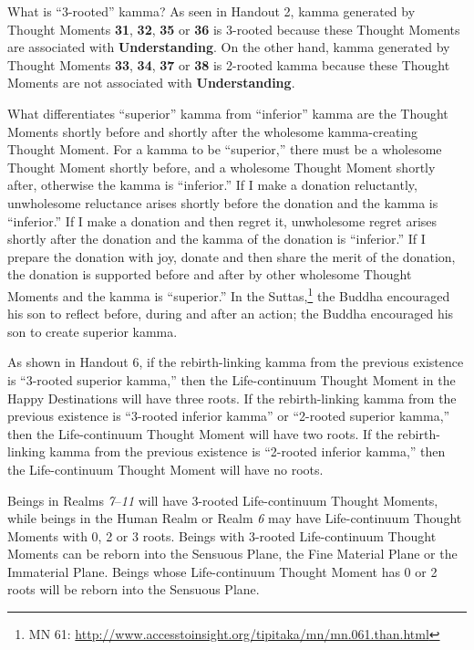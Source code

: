 What is “3-rooted” kamma? As seen in Handout 2, kamma generated by Thought Moments \textbf{31}, \textbf{32}, \textbf{35} or \textbf{36} is 3-rooted because these Thought Moments are associated with \textbf{Understanding}. On the other hand, kamma generated by Thought Moments \textbf{33}, \textbf{34}, \textbf{37} or \textbf{38} is 2-rooted kamma because these Thought Moments are not associated with \textbf{Understanding}.

What differentiates “superior” kamma from “inferior” kamma are the Thought Moments shortly before and shortly after the wholesome kamma-creating Thought Moment. For a kamma to be “superior,” there must be a wholesome Thought Moment shortly before, and a wholesome Thought Moment shortly after, otherwise the kamma is “inferior.” If I make a donation reluctantly, unwholesome reluctance arises shortly before the donation and the kamma is “inferior.” If I make a donation and then regret it, unwholesome regret arises shortly after the donation and the kamma of the donation is “inferior.” If I prepare the donation with joy, donate and then share the merit of the donation, the donation is supported before and after by other wholesome Thought Moments and the kamma is “superior.” In the Suttas,\footnote{MN 61: \url{http://www.accesstoinsight.org/tipitaka/mn/mn.061.than.html}} the Buddha encouraged his son to reflect before, during and after an action; the Buddha encouraged his son to create superior kamma.

As shown in Handout 6, if the rebirth-linking kamma from the previous existence is “3-rooted superior kamma,” then the Life-continuum Thought Moment in the Happy Destinations will have three roots. If the rebirth-linking kamma from the previous existence is “3-rooted inferior kamma” or “2-rooted superior kamma,” then the Life-continuum Thought Moment will have two roots. If the rebirth-linking kamma from the previous existence is “2-rooted inferior kamma,” then the Life-continuum Thought Moment will have no roots.

Beings in Realms \textit{7}--\textit{11} will have 3-rooted Life-continuum Thought Moments, while beings in the Human Realm or Realm \textit{6} may have Life-continuum Thought Moments with 0, 2 or 3 roots. Beings with 3-rooted Life-continuum Thought Moments can be reborn into the Sensuous Plane, the Fine Material Plane or the Immaterial Plane. Beings whose Life-continuum Thought Moment has 0 or 2 roots will be reborn into the Sensuous Plane.

